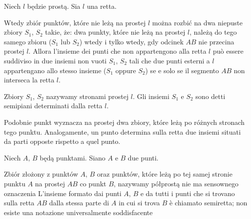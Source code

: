 \begin{proposition}
    Niech $l$ będzie prostą. %
    Sia $l$ una retta. %

    Wtedy zbiór punktów, które nie leżą na prostej $l$ można rozbić na dwa niepuste zbiory $S_1$, $S_2$ takie, że: dwa punkty, które nie leżą na prostej $l$, należą do tego samego zbioru ($S_1$ lub $S_2$) wtedy i tylko wtedy, gdy odcinek $AB$ nie przecina prostej $l$. %
    Allora l'insieme dei punti che non appartengono alla retta $l$ può essere suddiviso in due insiemi non vuoti $S_1$, $S_2$ tali che due punti esterni a $l$ appartengano allo stesso insieme ($S_1$ oppure $S_2$) se e solo se il segmento $AB$ non interseca la retta $l$. %
\end{proposition} %

Zbiory $S_1$, $S_2$ nazywamy stronami prostej $l$. %
Gli insiemi $S_1$ e $S_2$ sono detti semipiani determinati dalla retta $l$. %


Podobnie punkt wyznacza na prostej dwa zbiory, które leżą po różnych stronach tego punktu. %
Analogamente, un punto determina sulla retta due insiemi situati da parti opposte rispetto a quel punto. %

\begin{definition}
[półprosta] %
[semiretta] %
    Niech $A$, $B$ będą punktami. %
    Siano $A$ e $B$ due punti. %

    Zbiór złożony z punktów $A$, $B$ oraz punktów, które leżą po tej samej stronie punktu $A$ na prostej $AB$ co punkt $B$, nazywamy półprostą nie ma sensownego oznaczenia %
    L'insieme formato dai punti $A$, $B$ e da tutti i punti che si trovano sulla retta $AB$ dalla stessa parte di $A$ in cui si trova $B$ è chiamato semiretta; non esiste una notazione universalmente soddisfacente %


\end{definition} %


